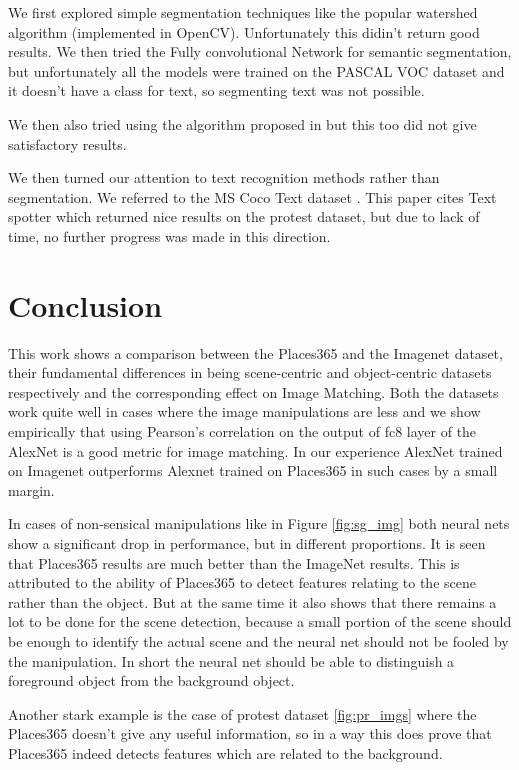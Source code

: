 \documentclass{article}
\begin{document}
We first explored simple segmentation techniques like the popular watershed algorithm (implemented in OpenCV)\cite{opecv}. Unfortunately this didin't return good results. We then tried the Fully convolutional Network for semantic segmentation\cite{Long_2015_CVPR}, but unfortunately all the models were trained on the PASCAL VOC dataset \cite{Everingham10} and it doesn't have a class for text, so segmenting text was not possible.

We then also tried using the algorithm proposed in \cite{Felzenszwalb:2004:EGI:981793.981796} but this too did not give satisfactory results.

We then turned our attention to text recognition methods rather than segmentation. We referred to the MS Coco Text dataset \cite{veit2016cocotext}. This paper cites Text spotter\cite{Gupta16} which returned nice results on the protest dataset, but due to lack of time, no further progress was made in this direction.

\section{Conclusion}
This work shows a comparison between the Places365 and the Imagenet dataset, their fundamental differences in being scene-centric and object-centric datasets respectively and the corresponding effect on Image Matching. Both the datasets work quite well in cases where the image manipulations are less and we show empirically that using Pearson's correlation on the output of fc8 layer of the AlexNet is a good metric for image matching. In our experience AlexNet trained on Imagenet outperforms Alexnet trained on Places365 in such cases by a small margin.

In cases of non-sensical manipulations like in Figure \ref{fig:sg_img} both neural nets show a significant drop in performance, but in different proportions. It is seen that Places365 results are much better than the ImageNet results. This is attributed to the ability of Places365 to detect features relating to the scene rather than the object. But at the same time it also shows that there remains a lot to be done for the scene detection, because a small portion of the scene should be enough to identify the actual scene and the neural net should not be fooled by the manipulation. In short the neural net should be able to distinguish a foreground object from the background object.

Another stark example is the case of protest dataset \ref{fig:pr_imgs} where the Places365 doesn't give any useful information, so in a way this does prove that Places365 indeed detects features which are related to the background.
\end{document}
